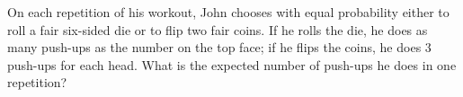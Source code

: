 On each repetition of his workout, John chooses with equal probability either to roll a fair six-sided die or to flip two fair coins. If he rolls the die, he does as many push-ups as the number on the top face; if he flips the coins, he does $3$ push-ups for each head. What is the expected number of push-ups he does in one repetition?
